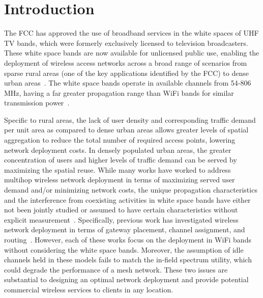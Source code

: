\section{Introduction}
\label{sec:introduction}



The FCC has approved the use of broadband services in the white spaces of 
UHF TV bands, which were formerly exclusively licensed to television broadcasters.
These white space bands are now available for unlicensed public use, enabling the
deployment of wireless access networks across a broad range of scenarios from 
sparse rural areas (one of the key applications identified by the FCC) to dense urban 
areas~\cite{carlson}. The white space bands operate in available channels from 
54-806 MHz, having a far greater propagation range than WiFi bands for similar
transmission power~\cite{balanis2012antenna}. 

Specific to rural areas, the lack of user density and corresponding traffic
demand per unit area as compared to dense urban areas allows greater levels of
spatial aggregation to reduce the total number of required access points, lowering
network deployment costs. In densely populated urban areas, the greater concentration
of users and higher levels of traffic demand can be served by maximizing the spatial
reuse. While many works have worked to address multihop wireless network deployment
in terms of maximizing served user demand and/or minimizing network costs,
the unique propagation characteristics and the interference from coexisting
activities in white space bands have either not been jointly studied or assumed to 
have certain characteristics without explicit measurement~\cite{si2010overview}. 
Specifically, previous work has investigated wireless 
network deployment in terms of gateway placement, channel assignment, and 
routing~\cite{he2008optimizing,marina2010topology}.
However, each of these works focus on the deployment in WiFi bands without
considering the white space bands. Moreover, the assumption of idle channels
held in these models fails to match the in-field spectrum utility,
which could degrade the performance of a mesh network. These
two issues are substantial to designing an optimal network deployment and
provide potential commercial wireless services to clients in any location.

